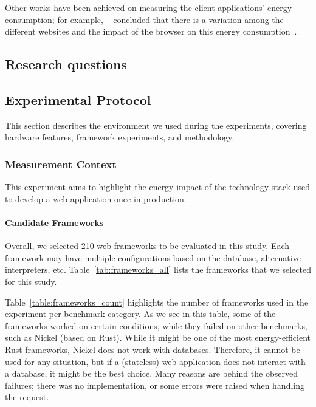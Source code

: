 Other works have been achieved on measuring the client applications' energy consumption; for example, ~\citeauthor{philippot_characterization_2014} concluded that there is a variation among the different websites and the impact of the browser on this energy consumption~\cite{philippot_characterization_2014}.

\subsection{Research questions }


\subsection{Experimental Protocol}
This section describes the environment we used during the experiments, covering hardware features, framework experiments, and methodology.

\subsubsection{Measurement Context}
This experiment aims to highlight the energy impact of the technology stack used to develop a web application once in production.



\paragraph{Candidate Frameworks}
Overall, we selected 210 web frameworks to be evaluated in this study.
Each framework may have multiple configurations based on the database, alternative interpreters, etc.
Table~\ref{tab:frameworks_all} lists the frameworks that we selected for this study.




% 

Table~\ref{table:frameworks_count} highlights the number of frameworks used in the experiment per benchmark category.
As we see in this table, some of the frameworks worked on certain conditions, while they failed on other benchmarks, such as Nickel (based on Rust).
While it might be one of the most energy-efficient Rust frameworks, Nickel does not work with databases.
Therefore, it cannot be used for any situation, but if a (stateless) web application does not interact with a database, it might be the best choice.
Many reasons are behind the observed failures; there was no implementation, or some errors were raised when handling the request.


